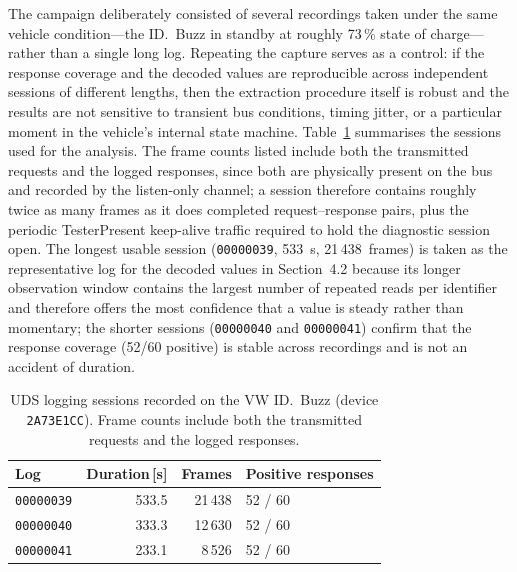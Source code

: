 \documentclass[11pt,a4paper,oneside,parskip=half]{scrreprt}
\begin{document}
The campaign deliberately consisted of several recordings taken under the same vehicle condition---the ID.~Buzz in standby at roughly 73\,\% state of charge---rather than a single long log. Repeating the capture serves as a control: if the response coverage and the decoded values are reproducible across independent sessions of different lengths, then the extraction procedure itself is robust and the results are not sensitive to transient bus conditions, timing jitter, or a particular moment in the vehicle's internal state machine. Table~\ref{tab:uds_logs} summarises the sessions used for the analysis. The frame counts listed include both the transmitted requests and the logged responses, since both are physically present on the bus and recorded by the listen-only channel; a session therefore contains roughly twice as many frames as it does completed request--response pairs, plus the periodic TesterPresent keep-alive traffic required to hold the diagnostic session open. The longest usable session (\texttt{00000039}, 533~s, 21\,438~frames) is taken as the representative log for the decoded values in Section~4.2 because its longer observation window contains the largest number of repeated reads per identifier and therefore offers the most confidence that a value is steady rather than momentary; the shorter sessions (\texttt{00000040} and \texttt{00000041}) confirm that the response coverage (52/60 positive) is stable across recordings and is not an accident of duration.

\begin{table}[H]
\caption{UDS logging sessions recorded on the VW ID.~Buzz (device \texttt{2A73E1CC}). Frame counts include both the transmitted requests and the logged responses.}
\label{tab:uds_logs}
\centering
\begin{tabular}{lrrl}
\toprule
\textbf{Log} & \textbf{Duration\,[s]} & \textbf{Frames} & \textbf{Positive responses} \\
\midrule
\texttt{00000039} & 533.5 & 21\,438 & 52 / 60 \\
\texttt{00000040} & 333.3 & 12\,630 & 52 / 60 \\
\texttt{00000041} & 233.1 &  8\,526 & 52 / 60 \\
\bottomrule
\end{tabular}
\end{table}
\end{document}
